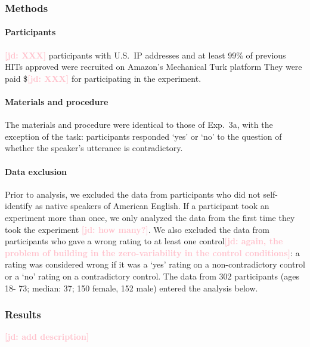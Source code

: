 \documentclass[11pt,fleqn]{article}
\newcommand{\jd}[1]{\textbf{\textcolor{Pink}{[jd: #1]}}}
\newcommand{\6}{\mbox{$[\hspace*{-.6mm}[$}}
\newcommand{\9}{\mbox{$]\hspace*{-.6mm}]$}}
\begin{document}
{\subsubsection{Methods}

\paragraph{Participants} \jd{XXX} participants with U.S.\ IP addresses and at least 99\% of previous HITs approved were recruited on Amazon's Mechanical Turk platform They were paid \$\jd{XXX} for participating in the experiment.

\paragraph{Materials and procedure} The materials and procedure were identical to those of Exp.~3a, with the exception of the task: participants responded `yes' or `no' to the question of whether the speaker's utterance is contradictory. 

\paragraph{Data exclusion} Prior to analysis, we excluded the data from participants who did not self-identify as native speakers of American English. If a participant took an experiment more than once, we only analyzed the data from the first time they took the experiment \jd{how many?}. We also excluded the data from participants who gave a wrong rating to at least one control\jd{again, the problem of building in the zero-variability in the control conditions}: a rating was considered wrong if it was a `yes' rating on a non-contradictory control or a `no' rating on a contradictory control. The data from 302 participants (ages 18- 73; median: 37; 150 female, 152 male) entered the analysis below. 
    


\subsubsection{Results}

\jd{add description}

}
\end{document}
